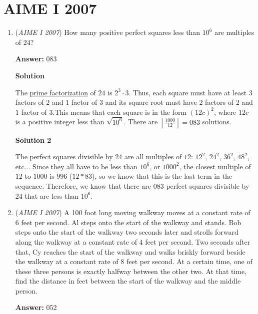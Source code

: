 \section{AIME I 2007}
        \begin{enumerate}
        	\item (\textit{AIME I 2007}) How many positive perfect squares less than $10^6$ are multiples of 24?


 
 \textbf{Answer: }083



\textbf{Solution}

The \href{https://artofproblemsolving.com/wiki/index.php?title=Prime\_factorization}{prime factorization} of $24$ is $2^3\cdot3$. Thus, each square must have at least $3$ factors of $2$ and $1$ factor of $3$ and its square root must have $2$ factors of $2$ and $1$ factor of $3$.This means that each square is in the form $(12c)^2$, where $12 c$ is a positive integer less than $\sqrt{10^6}$. There are $\left\lfloor \frac{1000}{12}\right\rfloor = \boxed{083}$ solutions.

 



\textbf{Solution 2}

The perfect squares divisible by $24$ are all multiples of $12$: $12^2$, $24^2$, $36^2$, $48^2$, etc... Since they all have to be less than $10^6$, or $1000^2$, the closest multiple of $12$ to $1000$ is $996$ ($12*83$), so we know that this is the last term in the sequence. Therefore, we know that there are $\boxed{083}$ perfect squares divisible by $24$ that are less than $10^6$.

 


	\item (\textit{AIME I 2007}) A 100 foot long moving walkway moves at a constant rate of 6 feet per second.  Al steps onto the start of the walkway and stands.  Bob steps onto the start of the walkway two seconds later and strolls forward along the walkway at a constant rate of 4 feet per second.  Two seconds after that, Cy reaches the start of the walkway and walks briskly forward beside the walkway at a constant rate of 8 feet per second.  At a certain time, one of these three persons is exactly halfway between the other two.  At that time, find the distance in feet between the start of the walkway and the middle person.


 
 \textbf{Answer: }052




\end{enumerate}
